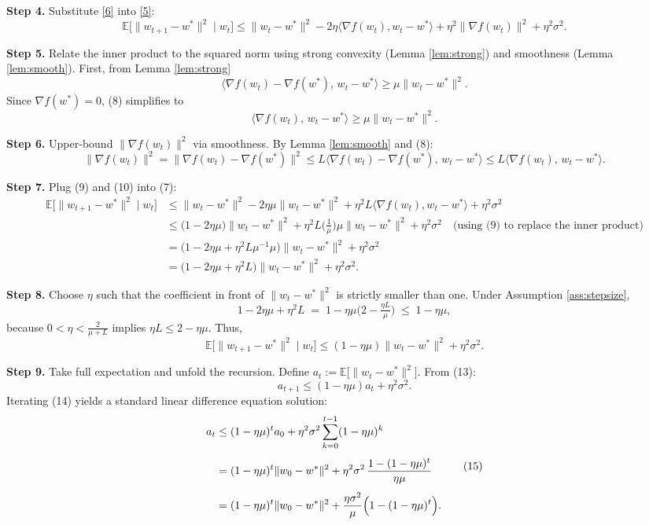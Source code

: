 \documentclass[11pt]{article}
\newcommand{\E}{\mathbb{E}}
\begin{document}
\noindent\textbf{Step 4.} Substitute \eqref{6} into \eqref{5}:
\[
\E\!\big[\|w_{t+1}-w^{*}\|^{2}\mid w_{t}\big]
\le \|w_{t}-w^{*}\|^{2}
-2\eta\langle \nabla f(w_{t}),w_{t}-w^{*}\rangle
+\eta^{2}\|\nabla f(w_{t})\|^{2}
+\eta^{2}\sigma^{2}.
\tag{7}
\]

\noindent\textbf{Step 5.} Relate the inner product to the squared norm using strong convexity (Lemma \ref{lem:strong}) and smoothness (Lemma \ref{lem:smooth}). First, from Lemma \ref{lem:strong}
\[
\langle \nabla f(w_{t})- \nabla f(w^{*}),\,w_{t}-w^{*}\rangle\ge\mu\|w_{t}-w^{*}\|^{2}.
\tag{8}
\]
Since $\nabla f(w^{*})=0$, (8) simplifies to
\[
\langle \nabla f(w_{t}),\,w_{t}-w^{*}\rangle\ge\mu\|w_{t}-w^{*}\|^{2}.
\tag{9}
\]

\noindent\textbf{Step 6.} Upper‑bound $\|\nabla f(w_{t})\|^{2}$ via smoothness. By Lemma \ref{lem:smooth} and (8):
\[
\|\nabla f(w_{t})\|^{2}
= \|\nabla f(w_{t})-\nabla f(w^{*})\|^{2}
\le L\langle \nabla f(w_{t})-\nabla f(w^{*}),\,w_{t}-w^{*}\rangle
\le L\langle \nabla f(w_{t}),\,w_{t}-w^{*}\rangle .
\tag{10}
\]

\noindent\textbf{Step 7.} Plug (9) and (10) into (7):
\[
\begin{aligned}
\E\!\big[\|w_{t+1}-w^{*}\|^{2}\mid w_{t}\big]
&\le \|w_{t}-w^{*}\|^{2}
-2\eta\mu\|w_{t}-w^{*}\|^{2}
+ \eta^{2}L\langle \nabla f(w_{t}),w_{t}-w^{*}\rangle
+\eta^{2}\sigma^{2}\\[4pt]
&\le \bigl(1-2\eta\mu\bigr)\|w_{t}-w^{*}\|^{2}
+ \eta^{2}L\bigl(\tfrac{1}{\mu}\bigr)\mu\|w_{t}-w^{*}\|^{2}
+\eta^{2}\sigma^{2}
\quad\text{(using (9) to replace the inner product)}\\[4pt]
&= \bigl(1-2\eta\mu + \eta^{2}L\mu^{-1}\mu\bigr)\|w_{t}-w^{*}\|^{2}
+\eta^{2}\sigma^{2}\\[4pt]
&= \bigl(1-2\eta\mu + \eta^{2}L\bigr)\|w_{t}-w^{*}\|^{2}
+\eta^{2}\sigma^{2}.
\end{aligned}
\tag{11}
\]

\noindent\textbf{Step 8.} Choose $\eta$ such that the coefficient in front of $\|w_{t}-w^{*}\|^{2}$ is strictly smaller than one. Under Assumption \ref{ass:stepsize},
\[
1-2\eta\mu+\eta^{2}L \;=\; 1-\eta\mu\bigl(2-\tfrac{\eta L}{\mu}\bigr)
\;\le\; 1-\eta\mu,
\tag{12}
\]
because $0<\eta<\frac{2}{\mu+L}$ implies $\eta L\le 2-\eta\mu$.  
Thus,
\[
\E\!\big[\|w_{t+1}-w^{*}\|^{2}\mid w_{t}\big]
\le (1-\eta\mu)\|w_{t}-w^{*}\|^{2}+\eta^{2}\sigma^{2}.
\tag{13}
\]

\noindent\textbf{Step 9.} Take full expectation and unfold the recursion. Define $a_{t}:=\E\!\big[\|w_{t}-w^{*}\|^{2}\big]$. From (13):
\[
a_{t+1}\le (1-\eta\mu)a_{t}+\eta^{2}\sigma^{2}.
\tag{14}
\]
Iterating (14) yields a standard linear difference equation solution:
\[
\begin{aligned}
a_{t}
&\le (1-\eta\mu)^{t}a_{0}
+ \eta^{2}\sigma^{2}\sum_{k=0}^{t-1}(1-\eta\mu)^{k}\\[4pt]
&= (1-\eta\mu)^{t}\|w_{0}-w^{*}\|^{2}
+ \eta^{2}\sigma^{2}\,\frac{1-(1-\eta\mu)^{t}}{\eta\mu}\\[4pt]
&= (1-\eta\mu)^{t}\|w_{0}-w^{*}\|^{2}
+ \frac{\eta\sigma^{2}}{\mu}\Bigl(1-(1-\eta\mu)^{t}\Bigr).
\end{aligned}
\tag{15}
\]
\end{document}
